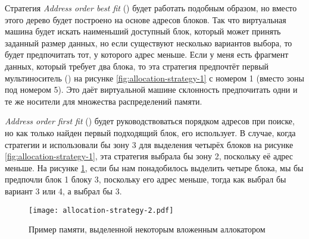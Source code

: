 \documentclass[11pt, oneside]{book}   	%
\newcommand\NamedRef[1]{\ref{#1} <<\nameref{#1}>>}
\begin{document}
Стратегия \emph{Address order best fit} () будет работать подобным образом, но вместо этого дерево будет построено на основе адресов блоков. Так что виртуальная машина будет искать наименьший доступный блок, который может принять заданный размер данных, но если существуют несколько вариантов выбора, то будет предпочитать тот, у которого адрес меньше. Если у меня есть фрагмент данных, который требует два блока, то эта стратегия предпочтёт первый мультиноситель () на рисунке \ref{fig:allocation-strategy-1} с номером 1 (вместо зоны под номером 5). Это даёт виртуальной машине склонность предпочитать одни и те же носители для множества распределений памяти.

\emph{Address order first fit} () будет руководствоваться порядком адресов при поиске, но как только найден первый подходящий блок,  его использует. В случае, когда стратегии  и  использовали бы зону 3 для выделения четырёх блоков на рисунке \ref{fig:allocation-strategy-1}, эта стратегия выбрала бы зону 2, поскольку её адрес меньше. На рисунке  \ref{fig:allocation-strategy-2}, если бы нам понадобилось выделить четыре блока, мы бы предпочли блок 1 блоку 3, поскольку его адрес меньше, тогда как  выбрал бы вариант 3 или 4, а  выбрал бы 3.

\begin{figure}
  \texttt{[image: allocation-strategy-2.pdf]}%
  \centering%
	\caption{Пример памяти, выделенной некоторым вложенным аллокатором}
   \label{fig:allocation-strategy-2}
\end{figure}
\FloatBarrier
\end{document}
